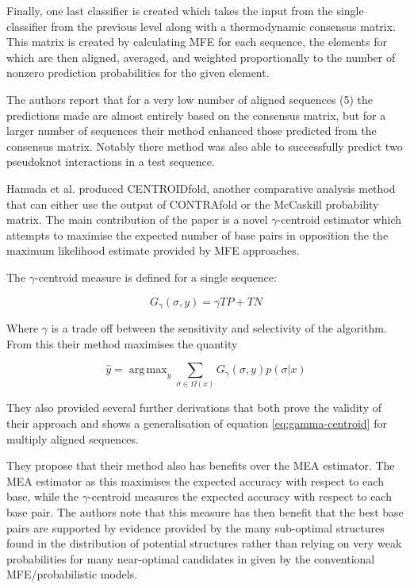 \documentclass[journal]{IEEEtran}
\DeclareMathOperator*{\argmax}{arg\,max}
\begin{document}
Finally, one last classifier is created which takes the input from the single classifier from the previous level along with a thermodynamic consensus matrix. This matrix is created by calculating MFE for each sequence, the elements for which are then aligned, averaged, and weighted proportionally to the number of nonzero prediction probabilities for the given element.

The authors report that for a very low number of aligned sequences (5) the predictions made are almost entirely based on the consensus matrix, but for a larger number of sequences their method enhanced those predicted from the consensus matrix. Notably there method was also able to successfully predict two pseudoknot interactions in a test sequence.

Hamada et al. \cite{hamada2009prediction, sato2009centroidfold} produced CENTROIDfold, another comparative analysis method that can either use the output of CONTRAfold or the McCaskill probability matrix. The main contribution of the paper is a novel $\gamma$-centroid estimator which attempts to maximise the expected number of base pairs in opposition the the maximum likelihood estimate provided by MFE approaches. 

The $\gamma$-centroid measure is defined for a single sequence:

\begin{equation}
	G_\gamma(\sigma, y) = \gamma TP + TN
\end{equation}

Where $\gamma$ is a trade off  between the sensitivity and selectivity of the algorithm. From this their method maximises the quantity

\begin{equation}
\label{eq:gamma-centroid}
	\hat{y} = \argmax_{y} \sum_{\sigma \in \Omega(x)} G_\gamma(\sigma, y) p(\sigma | x)
\end{equation}

They also provided several further derivations that both prove the validity of their approach and shows a generalisation of equation \ref{eq:gamma-centroid} for multiply aligned sequences.

They propose that their method also has benefits over the MEA estimator. The MEA estimator as this maximises the expected accuracy with respect to each base, while the $\gamma$-centroid measures the expected accuracy with respect to each base pair. The authors note that this measure has then benefit that the best base pairs are supported by evidence provided by the many sub-optimal structures found in the distribution of potential structures rather than relying on very weak probabilities for many near-optimal candidates in given by the conventional MFE/probabilistic models. 
\end{document}
